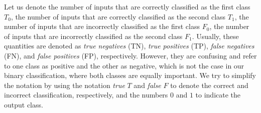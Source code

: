 Let us denote the number of inputs that are correctly classified as the first class $T_0$, the number of inputs that are correctly classified as the second class $T_1$, the number of inputs that are incorrectly classified as the first class $F_0$, the number of inputs that are incorrectly classified as the second class $F_1$.
Usually, these quantities are denoted as  \emph{true negatives} (TN), \emph{true positives} (TP), \emph{false negatives} (FN), and \emph{false positives} (FP), respectively.
However, they are confusing and refer to one class as positive and the other as negative, which is not the case in our binary classification, where both classes are equally important.
We try to simplify the notation by using the notation \emph{true} $T$ and \emph{false} $F$ to denote the correct and incorrect classification, respectively, and the numbers $0$ and $1$ to indicate the output class.

